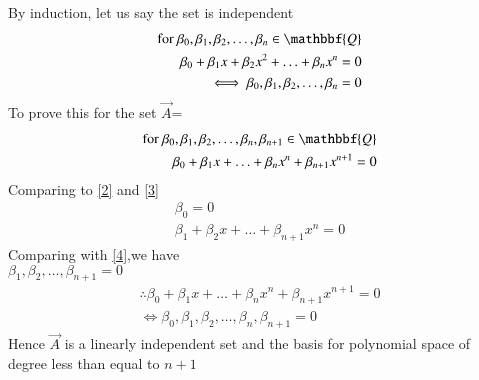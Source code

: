 \documentclass[journal,12pt,twocolumn]{IEEEtran}
\begin{document}
By induction, let us say the set  is independent
\begin{align}
\text{for  }\beta_0,\beta_1,\beta_2,\hdots,\beta_n \in \mathbbf{Q}\\
    \beta_0+\beta_1x+\beta_2x^2+\hdots+\beta_nx^n=0 \label{4}\\ \iff    \beta_0,\beta_1,\beta_2,\hdots,\beta_n=0
\end{align}
To prove this for the set $\vec{A}$=
\begin{align}
\text{for  }\beta_0,\beta_1,\beta_2,\hdots,\beta_n,\beta_{n+1} \in \mathbbf{Q}\\  
  \beta_0+\beta_1x+\hdots+\beta_nx^n+\beta_{n+1}x^{n+1}=0 
\end{align}
Comparing to \eqref{2} and \eqref{3}
\begin{align}
    \beta_0=0\\
    \beta_1+\beta_2x+\hdots+\beta_{n+1}x^n=0
\end{align}
Comparing with \eqref{4},we have\\
$\beta_1,\beta_2,\hdots,\beta_{n+1}=0$
\begin{align}
    \therefore  \beta_0+\beta_1x+\hdots+\beta_nx^n+\beta_{n+1}x^{n+1}=0 \\ \iff
    \beta_0,\beta_1,\beta_2,\hdots,\beta_n,\beta_{n+1}=0
\end{align}
Hence $\vec{A}$ is a linearly independent set and the basis for polynomial space of degree less than equal to $n+1$
\end{document}
